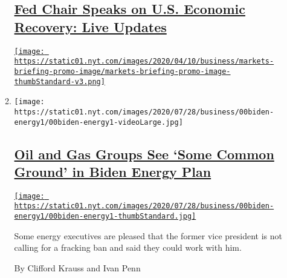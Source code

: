 \begin{enumerate}
\begin{enumerate}
    \hypertarget{fed-chair-speaks-on-us-economic-recovery-live-updates}{%
    \subsection{\texorpdfstring{\href{https://www.nytimes.com/live/2020/07/29/business/stock-market-today-coronavirus}{Fed
    Chair Speaks on U.S. Economic Recovery: Live
    Updates}}{Fed Chair Speaks on U.S. Economic Recovery: Live Updates}}\label{fed-chair-speaks-on-us-economic-recovery-live-updates}}

    \href{https://www.nytimes.com/live/2020/07/29/business/stock-market-today-coronavirus}{\texttt{[image: https://static01.nyt.com/images/2020/04/10/business/markets-briefing-promo-image/markets-briefing-promo-image-thumbStandard-v3.png]}}
  \item
    \texttt{[image: https://static01.nyt.com/images/2020/07/28/business/00biden-energy1/00biden-energy1-videoLarge.jpg]}

    \hypertarget{oil-and-gas-groups-see-some-common-ground-in-biden-energy-plan}{%
    \subsection{\texorpdfstring{\href{/2020/07/28/business/energy-environment/joe-biden-oil-gas-energy.html}{Oil
    and Gas Groups See `Some Common Ground' in Biden Energy
    Plan}}{Oil and Gas Groups See `Some Common Ground' in Biden Energy Plan}}\label{oil-and-gas-groups-see-some-common-ground-in-biden-energy-plan}}

    \href{/2020/07/28/business/energy-environment/joe-biden-oil-gas-energy.html}{\texttt{[image: https://static01.nyt.com/images/2020/07/28/business/00biden-energy1/00biden-energy1-thumbStandard.jpg]}}

    Some energy executives are pleased that the former vice president is
    not calling for a fracking ban and said they could work with him.

    By Clifford Krauss and Ivan Penn
  \end{enumerate}
\end{enumerate}

